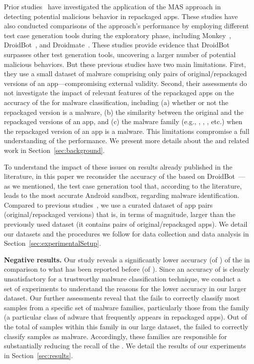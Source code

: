 Prior studies~\cite{DBLP:conf/wcre/BaoLL18,DBLP:journals/jss/CostaMMSSBNR22} have investigated the application of the MAS approach in detecting potential malicious behavior in repackaged apps. These studies have also conducted comparisons of the approach's performance by employing different test case generation tools during the exploratory phase, including Monkey~\cite{Monkey}, DroidBot~\cite{DBLP:conf/icse/LiYGC17}, and Droidmate~\cite{DBLP:conf/kbse/BorgesHZ18}.
These studies provide evidence that DroidBot surpasses other test generation tools, uncovering a larger number of potential malicious behaviors.
But these previous studies have two main limitations.
First, they use a small dataset of malware comprising only \appsSmall pairs of original/repackaged versions of an app---compromising external validity. Second, their assessments do not investigate
the impact of relevant features of the repackaged apps on the accuracy of the \mas for malware classification, including
(a) whether or not the repackaged version is a malware, (b) the similarity between the original and the repackaged versions of an app,
and (c) the malware family (e.g., , , , etc.) when the repackaged
version of an app is a malware. This limitations compromise a full understanding of the \mas performance. We present more details about the \mas and related work in Section~\ref{sec:background}.


To understand the impact of these issues on results already published in the literature, in this paper we reconsider the accuracy of the \mas based on
DroidBot~\cite{DBLP:conf/icse/LiYGC17}---as we mentioned, the test case generation tool that, according to the literature, leads to the most accurate Android sandbox, regarding malware identification. 
Compared to previous studies~\cite{DBLP:conf/wcre/BaoLL18,DBLP:conf/scam/CostaMCMVBC20},
we use a curated dataset of app pairs (original/repackaged versions) that is, in terms of magnitude, larger than the previously used
dataset (it contains \apps pairs of original/repackaged apps). We detail our datasets and the procedures we follow for data collection and data analysis in Section~\ref{sec:experimentalSetup}.
 
{\bf Negative results.} Our study reveals a significantly lower
accuracy (\fone of \fscore) of the \mas in comparison to what has been reported before (\fone of \fscoreSmall). 
Since an accuracy of \fscore is clearly unsatisfactory for a trustworthy malware classification technique, we conduct a set of experiments 
to understand the reasons for the lower accuracy in our larger dataset.
Our further assessments reveal that the \mas fails to correctly classify most samples from a specific set of malware families, particularly those from the \gps family (a particular class of adware that frequently appears in repackaged apps). Out of the total of \appsGps samples within this family in our large dataset, the \mas failed to correctly classify \appsGpsFN samples as malware. Accordingly, these families are responsible for substantially reducing the recall of the \mas. We detail the results of our experiments in Section~\ref{sec:results}. 

